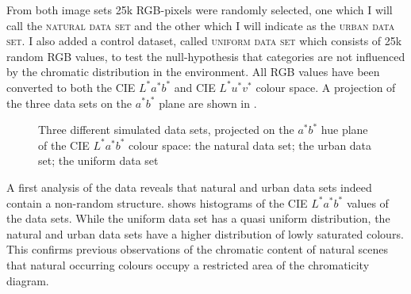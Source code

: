 From both image sets 25k RGB-pixels were randomly selected, one which
I will call the \textsc{natural data set} and the other which I will
indicate as the \textsc{urban data set}. I also added a control dataset,
called \textsc{uniform data set} which consists of 25k random RGB
values, to test the null-hypothesis that categories are not influenced
by the chromatic distribution in the environment. All RGB values have
been converted to both the CIE $L^*a^*b^*$ and CIE $L^*u^*v^*$ colour
space. A projection of the three data sets on the $a^*b^*$ plane are
shown in .

\begin{figure} 
\centering
{}
\caption[Three different simulated data sets]{Three different
  simulated data sets, projected on the $a^*b^*$ hue plane of the CIE
  $L^*a^*b^*$ colour space:  the natural
  data set;  the urban data set;
   the uniform data set}
\label{f:simulated-data-sets}
\end{figure}


A first analysis of the data reveals that natural and urban data sets
indeed contain a non-random structure.  shows histograms of the CIE $L^*a^*b^*$
values of the data sets. While the uniform data set has a quasi
uniform distribution, the natural and urban data sets have a higher
distribution of lowly saturated colours. This confirms previous
observations of the chromatic content of natural scenes
\citep{howard94colors} that natural occurring
colours occupy a restricted area of the chromaticity diagram.


